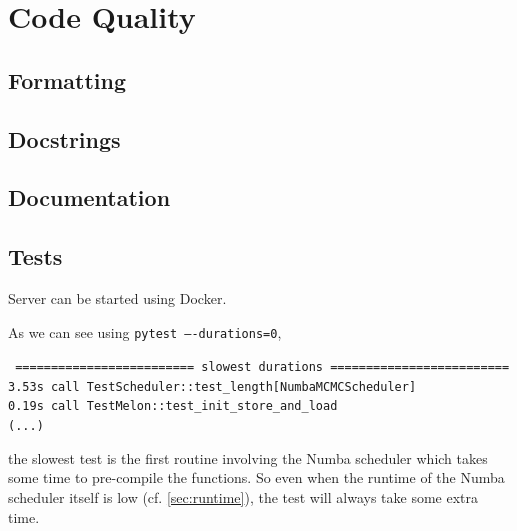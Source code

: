 \documentclass{prettytex/ox/mmsc-special-topic}
\begin{document}
  \section{Code Quality}
  \subsection{Formatting}
  \subsection{Docstrings}
  \subsection{Documentation}
  \subsection{Tests}
  Server can be started using Docker.

  As we can see using \texttt{pytest ----durations=0},

  \texttt{
    ========================= slowest durations ========================= \\
    3.53s call TestScheduler::test\_length[NumbaMCMCScheduler] \\
    0.19s call TestMelon::test\_init\_store\_and\_load \\
    (...)
  }

  the slowest test is the first routine involving the Numba scheduler which takes some time to pre-compile the functions.
  So even when the runtime of the Numba scheduler itself is low (cf. \cref{sec:runtime}), the test will always take some extra time.
\end{document}
